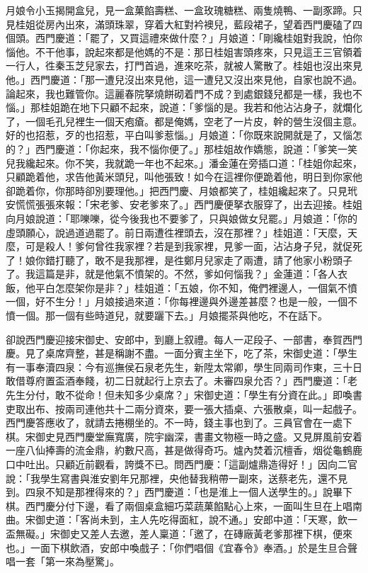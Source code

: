 月娘令小玉揭開盒兒，見一盒菓餡壽糕、一盒玫瑰糖糕、兩隻燒鴨、一副豕蹄。只見桂姐從房內出來，滿頭珠翠，穿着大紅對衿襖兒，藍段裙子，望着西門慶磕了四個頭。西門慶道：「罷了，又買這禮來做什麼？」月娘道：「剛纔桂姐對我說，怕你惱他。不干他事，說起來都是他媽的不是：那日桂姐害頭疼來，只見這王三官領着一行人，徃秦玉芝兒家去，打門首過，進來吃茶，就被人驚散了。桂姐也沒出來見他。」西門慶道：「那一遭兒沒出來見他，這一遭兒又沒出來見他，自家也說不過。論起來，我也難管你。這麗春院拏燒餅砌着門不成？到處銀錢兒都是一樣，我也不惱。」{}那桂姐跪在地下只顧不起來，說道：「爹惱的是。我若和他沾沾身子，就爛化了，一個毛孔兒裡生一個天疱瘡。都是俺媽，空老了一片皮，幹的營生沒個主意。好的也招惹，歹的也招惹，平白叫爹惹惱。」月娘道：「你既來說開就是了，又惱怎的？」西門慶道：「你起來，我不惱你便了。」{}那桂姐故作嬌態，說道：「爹笑一笑兒我纔起來。你不笑，我就跪一年也不起來。」潘金蓮在旁插口道：「桂姐你起來，只顧跪着他，求告他黃米頭兒，叫他張致！如今在這裡你便跪着他，明日到你家他卻跪着你，{}你那時卻別要理他。」{}把西門慶、月娘都笑了，桂姐纔起來了。只見玳安慌慌張張來報：「宋老爹、安老爹來了。」西門慶便拏衣服穿了，出去迎接。桂姐向月娘說道：「耶嚛嚛，從今後我也不要爹了，只與娘做女兒罷。」月娘道：「你的虛頭願心，說過道過罷了。前日兩遭徃裡頭去，沒在那裡？」桂姐道：「天麼，天麼，可是殺人！爹何曾徃我家裡？{}若是到我家裡，見爹一面，沾沾身子兒，就促死了！娘你錯打聽了，敢不是我那裡，是徃鄭月兒家走了兩遭，請了他家小粉頭子了。我這篇是非，就是他氣不憤架的。不然，爹如何惱我？」{}金蓮道：「各人衣飯，他平白怎麼架你是非？」{}桂姐道：「五娘，你不知，俺們裡邊人，一個氣不憤一個，好不生分！」月娘接過來道：「你每裡邊與外邊差甚麼？也是一般，一個不憤一個。那一個有些時道兒，就要躧下去。」{}月娘擺茶與他吃，不在話下。

卻說西門慶迎接宋御史、安郎中，到廳上叙禮。每人一疋段子、一部書，奉賀西門慶。見了桌席齊整，甚是稱謝不盡。一面分賓主坐下，吃了茶，宋御史道：「學生有一事奉瀆四泉：今有巡撫侯石泉老先生，新陞太常卿，學生同兩司作東，三十日敢借尊府置盃酒奉餞，初二日就起行上京去了。未審四泉允否？」西門慶道：「老先生分付，敢不從命！但未知多少桌席？」宋御史道：「學生有分資在此。」即喚書吏取出布、按兩司連他共十二兩分資來，要一張大插桌、六張散桌，叫一起戲子。西門慶答應收了，就請去捲棚坐的。不一時，錢主事也到了。三員官會在一處下棋。宋御史見西門慶堂廡寬廣，院宇幽深，書畫文物極一時之盛。又見屏風前安着一座八仙捧壽的流金鼎，約數尺高，甚是做得奇巧。爐內焚着沉檀香，烟從龜鶴鹿口中吐出。只顧近前觀看，誇獎不已。{}問西門慶：「這副爐鼎造得好！」因向二官說：「我學生寫書與淮安劉年兄那裡，央他替我稍帶一副來，送蔡老先，還不見到。四泉不知是那裡得來的？」西門慶道：「也是淮上一個人送學生的。」說畢下棋。西門慶分付下邊，看了兩個桌盒細巧菜蔬菓餡點心上來，一面叫生旦在上唱南曲。宋御史道：「客尚未到，主人先吃得面紅，說不通。」安郎中道：「天寒，飲一盃無礙。」宋御史又差人去邀，差人稟道：「邀了，在磚廠黃老爹那裡下棋，便來也。」一面下棋飲酒，安郎中喚戲子：「你們唱個《宜春令》奉酒。」於是生旦合聲唱一套「第一來為壓驚」。

